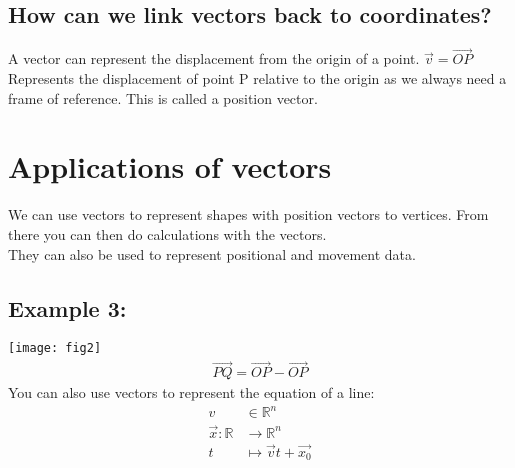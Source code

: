 \documentclass[class=article, crop=false]{standalone}
\begin{document}
\subsection*{How can we link vectors back to coordinates?}
A vector can represent the displacement from the origin of a point.
$ \vec{v} = \overrightarrow{OP} $ Represents the displacement of point P relative to the origin as we always need a frame of reference. This is called a position vector.
\section*{Applications of vectors}
We can use vectors to represent shapes with position vectors to vertices. From there you can then do calculations with the vectors.\\
They can also be used to represent positional and movement data. 
\subsection*{Example 3:}
\texttt{[image: fig2]} \\
\begin{align*}
\overrightarrow{PQ} = \overrightarrow{OP} - \overrightarrow{OP}
\end{align*}
You can also use vectors to represent the equation of a line:
\begin{align*}
v & \in \mathbb{R}^n \\
\vec{x}: \mathbb{R} & \rightarrow \mathbb{R}^n \\
t & \mapsto \vec{v}t + \vec{x_0} \\
\end{align*}
\end{document}
